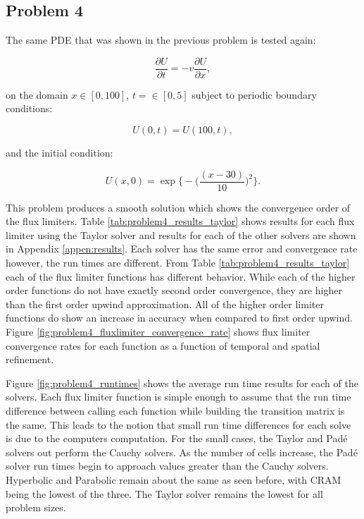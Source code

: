 \clearpage

\subsection{Problem 4}

The same PDE that was shown in the previous problem is tested again:

\begin{equation}
    \frac{\partial U}{\partial t} = -v\frac{\partial U}{\partial x},
    \label{eq:convection_PDE}
\end{equation}

\noindent on the domain $x \in [0, 100]$, $t =\in [0, 5]$ subject to periodic boundary conditions:

\begin{equation}
    U(0,t) = U(100, t),
\end{equation}

\noindent and the initial condition:

\begin{equation}
    U(x,0) = \exp\bigg\{-\bigg(\frac{(x-30)}{10}\bigg)^{2}\bigg\}.
\end{equation}

\noindent This problem produces a smooth solution which shows the convergence order of the flux limiters. Table \ref{tab:problem4_results_taylor} shows results for each flux limiter using the Taylor solver and results for each of the other solvers are shown in Appendix \ref{appen:results}. Each solver has the same error and convergence rate however, the run times are different. From Table \ref{tab:problem4_results_taylor} each of the flux limiter functions has different behavior. While each of the higher order functions do not have exactly second order convergence, they are higher than the first order upwind approximation. All of the higher order limiter functions do show an increase in accuracy when compared to first order upwind. Figure \ref{fig:problem4_fluxlimiter_convergence_rate} shows flux limiter convergence rates for each function as a function of temporal and spatial refinement. 

Figure \ref{fig:problem4_runtimes} shows the average run time results for each of the solvers. Each flux limiter function is simple enough to assume that the run time difference between calling each function while building the transition matrix is the same. This leads to the notion that small run time differences for each solve is due to the computers computation. For the small cases, the Taylor and Pad\'e solvers out perform the Cauchy solvers. As the number of cells increase, the Pad\'e solver run times begin to approach values greater than the Cauchy solvers. Hyperbolic and Parabolic remain about the same as seen before, with CRAM being the lowest of the three. The Taylor solver remains the lowest for all problem sizes. 

